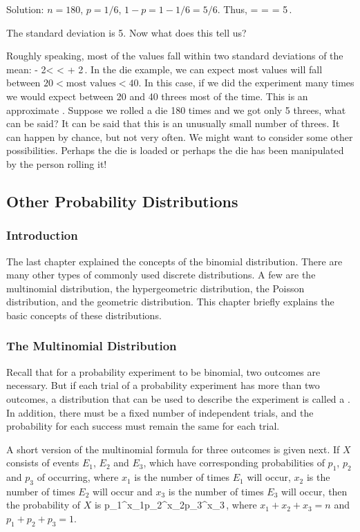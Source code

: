 Solution: $n = 180$, $p = 1/6$, $1 - p = 1 - 1/6 = 5/6$. Thus, 
\beq
\sigma =  =  = 5\,.
\eeq

The standard deviation is 5. Now what does this tell us?

Roughly speaking, most of the values fall within two standard deviations of the mean:
\beq
\mu - 2\sigma <  < \mu + 2\sigma\,.
\eeq
In the die example, we can expect most values will fall between $20 < \text{most values} < 40$. In this case, if we did the experiment many times we would expect between 20 and 40 threes most of the time. This is an approximate . Suppose we rolled a die 180 times and we got only 5 threes, what can be said? It can be said that this is an unusually small number of threes. It can happen by chance, but not very often. We might want to consider some other possibilities. Perhaps the die is loaded or perhaps the die has been manipulated by the person rolling it!


\subsection{Other Probability Distributions}

\subsubsection{Introduction}
The last chapter explained the concepts of the binomial distribution. There are many other types of commonly used discrete distributions. A few are the multinomial distribution, the hypergeometric distribution, the Poisson distribution, and the geometric distribution. This chapter briefly explains the basic concepts of these distributions.

\subsubsection{The Multinomial Distribution}
Recall that for a probability experiment to be binomial, two outcomes are necessary. But if each trial of a probability experiment has more than two outcomes, a distribution that can be used to describe the experiment is called a . In addition, there must be a fixed number of independent trials, and the probability for each success must remain the same for each trial.

A short version of the multinomial formula for three outcomes is given next. If $X$ consists of events $E_1$, $E_2$ and $E_3$, which have corresponding probabilities of $p_1$, $p_2$ and $p_3$ of occurring, where $x_1$ is the number of times $E_1$ will occur, $x_2$ is the number of times $E_2$ will occur and $x_3$ is the number of times $E_3$ will occur, then the probability of $X$ is
\beq
{}p_1^{x_1}p_2^{x_2}p_3^{x_3}\,,
\eeq
where $x_1 + x_2 + x_3 = n$ and $p_1 + p_2 + p_3 = 1$.

